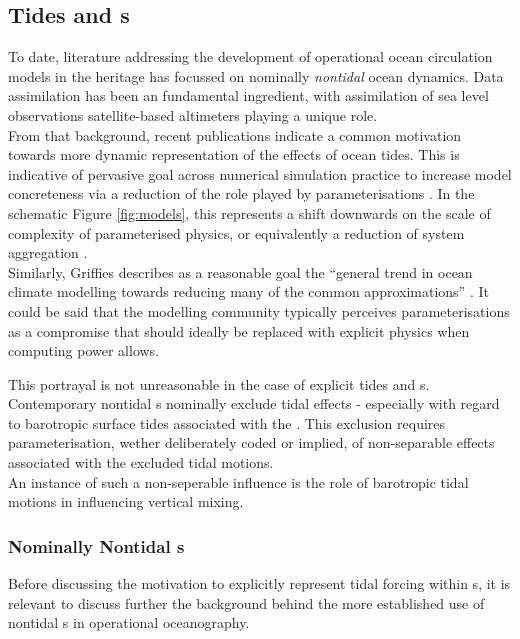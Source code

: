 
\subsection{Tides and \OGCM{}s}
\label{S:tides_ogcm}
To date, literature addressing the development of operational ocean circulation models in the \GODAE{} heritage has focussed on nominally \emph{nontidal} ocean dynamics.  Data assimilation has been an fundamental ingredient,  with assimilation of sea level observations satellite-based altimeters playing a unique role.\\



From that background, recent publications indicate a common motivation towards more dynamic representation of the effects of ocean tides.   This is indicative of pervasive goal across numerical simulation practice to increase model concreteness via a reduction of the role played by parameterisations \cite[section 5.3]{Petersen:2012tr}.  In the schematic Figure \ref{fig:models}, this represents a shift downwards on the scale of complexity of parameterised physics, or equivalently a reduction of system aggregation \citep{Stevens:2001kb}.\\
Similarly, Griffies describes as a reasonable goal the ``general trend in ocean climate modelling towards reducing many of the common approximations'' \citep[pp20] {Griffies:2004vs}.
It could be said that the modelling community typically perceives parameterisations as a compromise that should ideally be replaced with explicit physics when computing power allows.



This portrayal is not unreasonable in the case of explicit tides and \OGCM{}s.
Contemporary nontidal \OGCM{}s nominally exclude tidal effects - especially with regard to barotropic surface tides associated with the \ATGP{}.  This exclusion requires parameterisation, wether deliberately coded or implied, of non-separable effects associated with the excluded tidal motions.\\
An instance of such a non-seperable influence is the role of barotropic tidal motions in influencing vertical mixing.\\




\subsubsection{Nominally Nontidal \OGCM{}s}
\label{S:nontidal}
Before discussing the motivation to explicitly represent tidal forcing within \OGCM{}s, it is relevant to discuss further the background behind the more established use of nontidal \OGCM{}s in operational oceanography.




